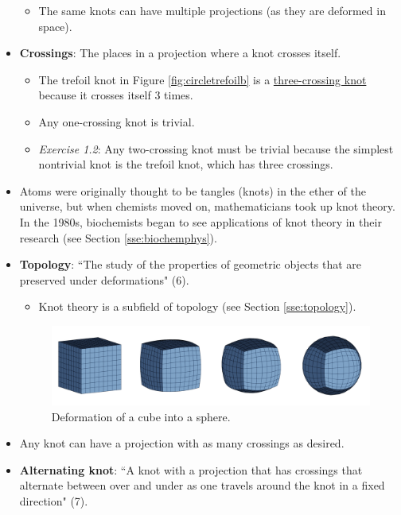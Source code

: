 \documentclass[titlepage]{article}
\numberwithin{figure}{section}
\numberwithin{table}{section}
\numberwithin{equation}{section}
\newcommand{\dq}[2]{``#1" (#2).}
\begin{document}
\begin{itemize}
    \begin{itemize}
        \item The same knots can have multiple projections (as they are deformed in space).
    \end{itemize}
    \item \textbf{Crossings}: The places in a projection where a knot crosses itself.
    \begin{itemize}
        \item The trefoil knot in Figure \ref{fig:circletrefoilb} is a \underline{three-crossing knot} because it crosses itself 3 times.
        \item Any one-crossing knot is trivial.
        \item \emph{Exercise 1.2}: Any two-crossing knot must be trivial because the simplest nontrivial knot is the trefoil knot, which has three crossings.
    \end{itemize}
    \item Atoms were originally thought to be tangles (knots) in the ether of the universe, but when chemists moved on, mathematicians took up knot theory. In the 1980s, biochemists began to see applications of knot theory in their research (see Section \ref{sse:biochemphys}).
    \item \textbf{Topology}: \dq{The study of the properties of geometric objects that are preserved under deformations}{6}
    \begin{itemize}
        \item Knot theory is a subfield of topology (see Section \ref{sse:topology}).
    \end{itemize}
    \begin{figure}[h!]
        \centering
        \includegraphics[width=0.7\linewidth]{Blender/CubeSphere.png}
        \caption{Deformation of a cube into a sphere.}
        \label{fig:cubesphere}
    \end{figure}
    \item Any knot can have a projection with as many crossings as desired.
    \item \textbf{Alternating knot}: \dq{A knot with a projection that has crossings that alternate between over and under as one travels around the knot in a fixed direction}{7}
    \begin{itemize}

\end{itemize}
\end{itemize}
\end{document}
